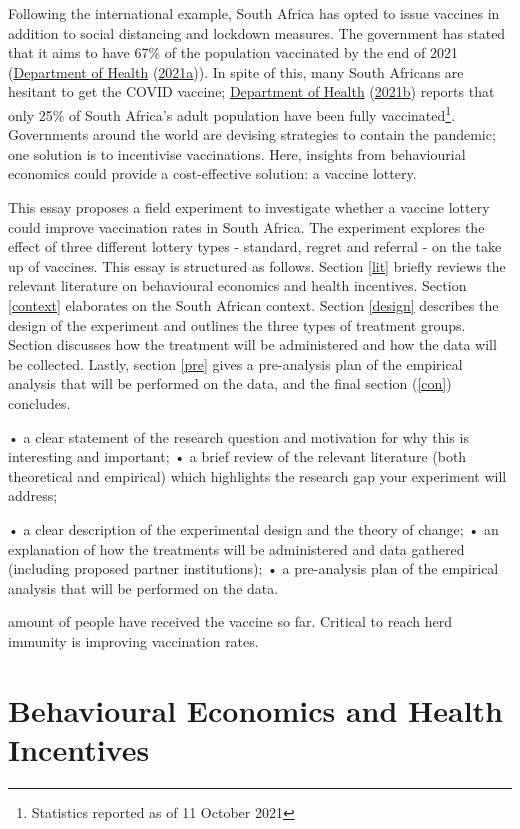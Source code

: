 \documentclass[11pt,preprint, authoryear]{elsarticle}
\numberwithin{equation}{section}
\numberwithin{figure}{section}
\numberwithin{table}{section}
\let\rmarkdownfootnote\footnote%
\def\footnote{\protect\rmarkdownfootnote}
\begin{document}
Following the international example, South Africa has opted to issue
vaccines in addition to social distancing and lockdown measures. The
government has stated that it aims to have 67\% of the population
vaccinated by the end of 2021 (\protect\hyperlink{ref-herd}{Department
of Health} (\protect\hyperlink{ref-herd}{2021a})). In spite of this,
many South Africans are hesitant to get the COVID vaccine;
\protect\hyperlink{ref-stat}{Department of Health}
(\protect\hyperlink{ref-stat}{2021b}) reports that only 25\% of South
Africa's adult population have been fully vaccinated\footnote{Statistics
  reported as of 11 October 2021}. Governments around the world are
devising strategies to contain the pandemic; one solution is to
incentivise vaccinations. Here, insights from behaviourial economics
could provide a cost-effective solution: a vaccine lottery.

This essay proposes a field experiment to investigate whether a vaccine
lottery could improve vaccination rates in South Africa. The experiment
explores the effect of three different lottery types - standard, regret
and referral - on the take up of vaccines. This essay is structured as
follows. Section \ref{lit} briefly reviews the relevant literature on
behavioural economics and health incentives. Section \ref{context}
elaborates on the South African context. Section \ref{design} describes
the design of the experiment and outlines the three types of treatment
groups. Section \label{treat} discusses how the treatment will be
administered and how the data will be collected. Lastly, section
\ref{pre} gives a pre-analysis plan of the empirical analysis that will
be performed on the data, and the final section (\ref{con}) concludes.

• a clear statement of the research question and motivation for why this
is interesting and important; • a brief review of the relevant
literature (both theoretical and empirical) which highlights the
research gap your experiment will address;

• a clear description of the experimental design and the theory of
change; • an explanation of how the treatments will be administered and
data gathered (including proposed partner institutions); • a
pre-analysis plan of the empirical analysis that will be performed on
the data.

amount of people have received the vaccine so far. Critical to reach
herd immunity is improving vaccination rates.

\hypertarget{behavioural-economics-and-health-incentives}{%
\section{\texorpdfstring{Behavioural Economics and Health Incentives
\label{lit}}{Behavioural Economics and Health Incentives }}\label{behavioural-economics-and-health-incentives}}
\end{document}
